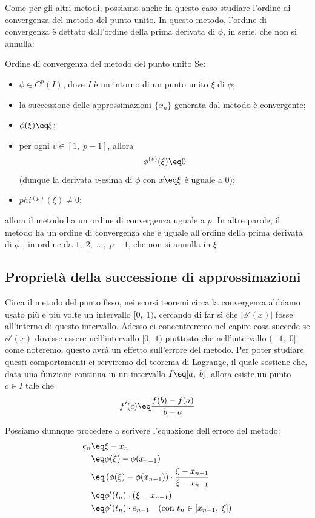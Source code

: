 Come per gli altri metodi, possiamo anche in questo caso studiare l'ordine di convergenza del metodo del punto unito. In questo metodo, l'ordine di convergenza è dettato dall'ordine della prima derivata di $\phi$, in serie, che non si annulla:

\begin{theorem}{Ordine di convergenza del metodo del punto unito}
    Se:
    \begin{itemize}
        \item $\phi \in C^p(I)$, dove $I$ è un intorno di un punto unito $\xi$ di $\phi$;
        \item la successione delle approssimazioni $\{ x_n \}$ generata dal metodo è convergente;
        \item $\phi(\xi) \eq \xi$;
        \item per ogni $v \in [1, \; p - 1]$, allora
        \[ \phi^{(v)} (\xi) \eq 0 \]
        (dunque la derivata $v$-esima di $\phi$ con $x \eq \xi$ è uguale a $0$);
        \item $phi^{(p)}(\xi) \neq 0$;
    \end{itemize}

    allora il metodo ha un ordine di convergenza uguale a $p$. In altre parole, il metodo ha un ordine di convergenza che è uguale all'ordine della prima derivata di $\phi$ , in ordine da $1, \; 2, \; ..., \; p-1$, che non si annulla in $\xi$
\end{theorem}

\subsection{Proprietà della successione di approssimazioni}

Circa il metodo del punto fisso, nei scorsi teoremi circa la convergenza abbiamo usato più e più volte un intervallo $[0, \; 1)$, cercando di far sì che $|\phi'(x)|$ fosse all'interno di questo intervallo. Adesso ci concentreremo nel capire cosa succede se $\phi'(x)$ dovesse essere nell'intervallo $[0, \; 1)$ piuttosto che nell'intervallo $(-1, \; 0]$; come noteremo, questo avrà un effetto sull'errore del metodo. Per poter studiare questi comportamenti ci serviremo del teorema di Lagrange, il quale sostiene che, data una funzione continua in un intervallo $I \eq [a, \; b]$, allora esiste un punto $c \in I$ tale che
\[ f'(c) \eq \frac{f(b) - f(a)}{b - a} \]

Possiamo dunnque procedere a scrivere l'equazione dell'errore del metodo:
\begin{align*}
    e_n &\eq \xi - x_n \\
    &\eq \phi(\xi) - \phi(x_{n - 1}) \\
    &\eq \left(\phi(\xi) - \phi(x_{n - 1})\right) \cdot \frac{\xi - x_{n - 1}}{\xi - x_{n - 1}} \\
    &\eq \phi'(t_n) \cdot (\xi - x_{n - 1}) \\
    &\eq \phi'(t_n) \cdot e_{n - 1} \quad (\text{con } t_n \in [x_{n - 1}, \; \xi]) 
\end{align*}

